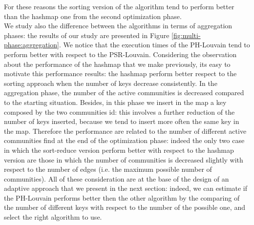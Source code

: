 For these reasons the sorting version of the algorithm tend to perform better than the hashmap one from the second optimization phase. \\
We study also the difference between the algorithms in terms of aggregation phases: the results of our study are presented in Figure \ref{fig:multi-phase:aggregation}.
We notice that the execution times of the PH-Louvain tend to perform better with respect to the PSR-Louvain. Considering the observation about the performance of the hashmap that we make previously, its easy to motivate this performance results: the hashmap perform better respect to the sorting approach when the number of keys decrease consistently. In the aggregation phase, the number of the active communities is decreased compared to the starting situation. Besides, in this phase we insert in the map a key composed by the two communities id: this involves a further reduction of the number of keys inserted, because we tend to insert more often the same key in the map. Therefore the performance are related to the number of different active communities find at the end of the optimization phase: indeed the only two case in which the sort-reduce version perform better with respect to the hashmap version are those in which the number of communities is decreased slightly with respect to the number of edges (i.e. the maximum possible number of communities).
All of these consideration are at the base of the design of an adaptive approach that we present in the next section: indeed, we can estimate if the PH-Louvain performs better then the other algorithm by the comparing of the number of different keys with respect to the number of the possible one, and select the right algorithm to use.	
